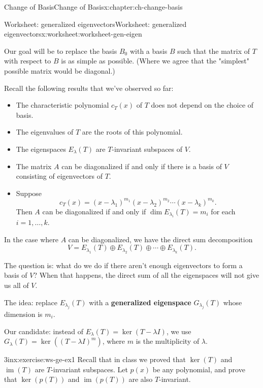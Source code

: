 \documentclass[oneside,10pt,]{book}
\newcommand{\terminology}[1]{\textbf{#1}}
\numberwithin{equation}{section}
\begin{document}
\begin{chapterptx}{Change of Basis}{}{Change of Basis}{}{}{x:chapter:ch-change-basis}
\begin{worksheet-section}{Worksheet: generalized eigenvectors}{}{Worksheet: generalized eigenvectors}{}{}{x:worksheet:worksheet-gen-eigen}
\par
Our goal will be to replace the basis \(B_0\) with a basis \(B\) such that the matrix of \(T\) with respect to \(B\) is as simple as possible. (Where we agree that the "simplest" possible matrix would be diagonal.)%
\par
Recall the following results that we've observed so far:%
\begin{itemize}[label=\textbullet]
\item{}The characteristic polynomial \(c_T(x)\) of \(T\) does not depend on the choice of basis.%
\item{}The eigenvalues of \(T\) are the roots of this polynomial.%
\item{}The eigenspaces \(E_\lambda(T)\) are \(T\)-invariant subspaces of \(V\).%
\item{}The matrix \(A\) can be diagonalized if and only if there is a basis of \(V\) consisting of eigenvectors of \(T\).%
\item{}Suppose%
\begin{equation*}
c_T(x) = (x-\lambda_1)^{m_1}(x-\lambda_2)^{m_2}\cdots (x-\lambda_k)^{m_k}\text{.}
\end{equation*}
Then \(A\) can be diagonalized if and only if \(\dim E_{\lambda_i}(T) = m_i\) for each \(i=1,\ldots, k\).%
\end{itemize}
%
\par
In the case where \(A\) can be diagonalized, we have the direct sum decomposition%
\begin{equation*}
V = E_{\lambda_1}(T)\oplus E_{\lambda_2}(T) \oplus \cdots \oplus E_{\lambda_k}(T)\text{.}
\end{equation*}
%
\par
The question is: what do we do if there aren't enough eigenvectors to form a basis of \(V\)? When that happens, the direct sum of all the eigenspaces will not give us all of \(V\).%
\par
The idea: replace \(E_{\lambda_j}(T)\) with a \terminology{generalized eigenspace} \(G_{\lambda_j}(T)\) whose dimension is \(m_i\).%
\par
Our candidate: instead of \(E_{\lambda}(T) = \ker(T-\lambda I)\), we use \(G_\lambda(T) = \ker((T-\lambda I)^m)\), where \(m\) is the multiplicity of \(\lambda\).%
\clearpage
\begin{divisionexercise}{1}{}{3in}{x:exercise:ws-ge-ex1}%
Recall that in class we proved that \(\ker(T)\) and \(\operatorname{im}(T)\) are \(T\)-invariant subspaces. Let \(p(x)\) be any polynomial, and prove that \(\ker (p(T))\) and \(\operatorname{im}(p(T))\) are also \(T\)-invariant.%

\end{divisionexercise}
\end{worksheet-section}
\end{chapterptx}
\end{document}
